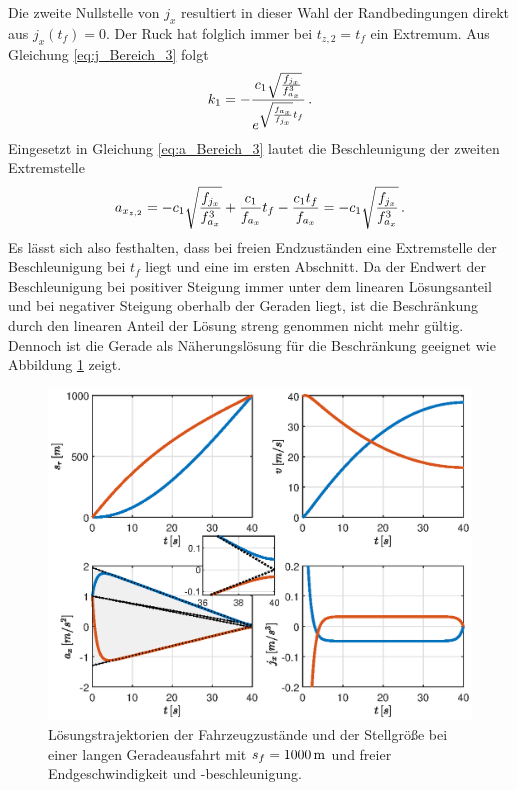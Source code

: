 Die zweite Nullstelle von $j_x$ resultiert in dieser Wahl der Randbedingungen direkt aus $j_x(t_f) = 0$. Der Ruck hat folglich immer bei $t_{z,2} = t_f$ ein Extremum. Aus Gleichung \eqref{eq:j_Bereich_3} folgt 
\begin{equation}
k_1 = -\frac{c_1\sqrt{\frac{f_{j_x}}{f_{a_x}^3}}}{e^{\sqrt{\frac{f_{a_x}}{f_{j_x}}}t_f}}\,.
\end{equation}
Eingesetzt in Gleichung \eqref{eq:a_Bereich_3} lautet die Beschleunigung der zweiten Extremstelle
\begin{equation}
a_{x_{z,2}} = -c_1\sqrt{\frac{f_{j_x}}{f_{a_x}^3}} + \frac{c_1}{f_{a_x}}t_f - \frac{c_1t_f}{f_{a_x}} = -c_1\sqrt{\frac{f_{j_x}}{f_{a_x}^3}}\,. 
\end{equation}
Es lässt sich also festhalten, dass bei freien Endzuständen eine Extremstelle der Beschleunigung bei $t_f$ liegt und eine im ersten Abschnitt. Da der Endwert der Beschleunigung bei positiver Steigung immer unter dem linearen Lösungsanteil und bei negativer Steigung oberhalb der Geraden liegt, ist die Beschränkung durch den linearen Anteil der Lösung streng genommen nicht mehr gültig. Dennoch ist die Gerade als Näherungslösung für die Beschränkung geeignet wie Abbildung \ref{fig:vf_af_frei} zeigt. 
\begin{figure}[h] 
	\centering
	\includegraphics[width=\linewidth]{./Bilder/Ergebnisse/Geradeausfahrt/vf_af_frei_mit_zoom.eps}
	\caption{Lösungstrajektorien der Fahrzeugzustände und der Stellgröße bei einer langen Geradeausfahrt mit $s_f=1000\,\mathrm{m}$ und freier Endgeschwindigkeit und -beschleunigung.}
	\label{fig:vf_af_frei}
\end{figure} 
